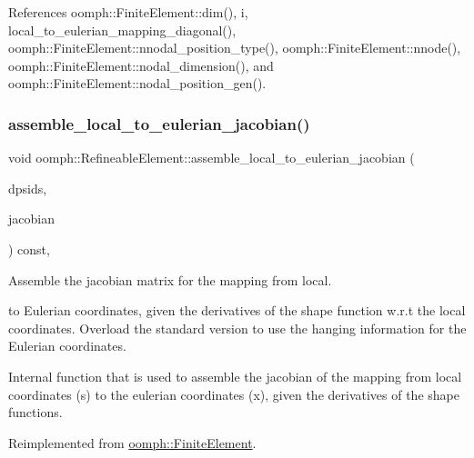 References oomph\+::\+Finite\+Element\+::dim(), i, local\+\_\+to\+\_\+eulerian\+\_\+mapping\+\_\+diagonal(), oomph\+::\+Finite\+Element\+::nnodal\+\_\+position\+\_\+type(), oomph\+::\+Finite\+Element\+::nnode(), oomph\+::\+Finite\+Element\+::nodal\+\_\+dimension(), and oomph\+::\+Finite\+Element\+::nodal\+\_\+position\+\_\+gen().

\mbox{\label{classoomph_1_1RefineableElement_a9936fe72471f1bd977b800c9e5696949}} 
\subsubsection{\texorpdfstring{assemble\+\_\+local\+\_\+to\+\_\+eulerian\+\_\+jacobian()}{assemble\_local\_to\_eulerian\_jacobian()}}
{\footnotesize\ttfamily void oomph\+::\+Refineable\+Element\+::assemble\+\_\+local\+\_\+to\+\_\+eulerian\+\_\+jacobian (\begin{DoxyParamCaption}\item[{const \hyperlink{classoomph_1_1DShape}{D\+Shape} \&}]{dpsids,  }\item[{\hyperlink{classoomph_1_1DenseMatrix}{Dense\+Matrix}$<$ double $>$ \&}]{jacobian }\end{DoxyParamCaption}) const\hspace{0.3cm}{\ttfamily [protected]}, {\ttfamily [virtual]}}



Assemble the jacobian matrix for the mapping from local. 

to Eulerian coordinates, given the derivatives of the shape function w.\+r.\+t the local coordinates. Overload the standard version to use the hanging information for the Eulerian coordinates.

Internal function that is used to assemble the jacobian of the mapping from local coordinates (s) to the eulerian coordinates (x), given the derivatives of the shape functions. 

Reimplemented from \hyperlink{classoomph_1_1FiniteElement_a613c731bee7d3a32aabba6a699364043}{oomph\+::\+Finite\+Element}.




